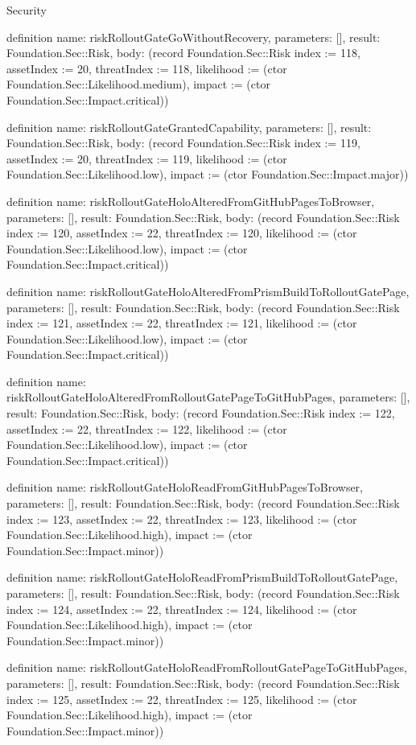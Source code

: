 \begin{lexlean}{Security}
\begin{semanticmodule}
definition{
  name: riskRolloutGateGoWithoutRecovery,
  parameters: [],
  result: Foundation.Sec::Risk,
  body: (record Foundation.Sec::Risk {index := 118, assetIndex := 20, threatIndex := 118, likelihood := (ctor Foundation.Sec::Likelihood.medium), impact := (ctor Foundation.Sec::Impact.critical)})
}

definition{
  name: riskRolloutGateGrantedCapability,
  parameters: [],
  result: Foundation.Sec::Risk,
  body: (record Foundation.Sec::Risk {index := 119, assetIndex := 20, threatIndex := 119, likelihood := (ctor Foundation.Sec::Likelihood.low), impact := (ctor Foundation.Sec::Impact.major)})
}

definition{
  name: riskRolloutGateHoloAlteredFromGitHubPagesToBrowser,
  parameters: [],
  result: Foundation.Sec::Risk,
  body: (record Foundation.Sec::Risk {index := 120, assetIndex := 22, threatIndex := 120, likelihood := (ctor Foundation.Sec::Likelihood.low), impact := (ctor Foundation.Sec::Impact.critical)})
}

definition{
  name: riskRolloutGateHoloAlteredFromPrismBuildToRolloutGatePage,
  parameters: [],
  result: Foundation.Sec::Risk,
  body: (record Foundation.Sec::Risk {index := 121, assetIndex := 22, threatIndex := 121, likelihood := (ctor Foundation.Sec::Likelihood.low), impact := (ctor Foundation.Sec::Impact.critical)})
}

definition{
  name: riskRolloutGateHoloAlteredFromRolloutGatePageToGitHubPages,
  parameters: [],
  result: Foundation.Sec::Risk,
  body: (record Foundation.Sec::Risk {index := 122, assetIndex := 22, threatIndex := 122, likelihood := (ctor Foundation.Sec::Likelihood.low), impact := (ctor Foundation.Sec::Impact.critical)})
}

definition{
  name: riskRolloutGateHoloReadFromGitHubPagesToBrowser,
  parameters: [],
  result: Foundation.Sec::Risk,
  body: (record Foundation.Sec::Risk {index := 123, assetIndex := 22, threatIndex := 123, likelihood := (ctor Foundation.Sec::Likelihood.high), impact := (ctor Foundation.Sec::Impact.minor)})
}

definition{
  name: riskRolloutGateHoloReadFromPrismBuildToRolloutGatePage,
  parameters: [],
  result: Foundation.Sec::Risk,
  body: (record Foundation.Sec::Risk {index := 124, assetIndex := 22, threatIndex := 124, likelihood := (ctor Foundation.Sec::Likelihood.high), impact := (ctor Foundation.Sec::Impact.minor)})
}

definition{
  name: riskRolloutGateHoloReadFromRolloutGatePageToGitHubPages,
  parameters: [],
  result: Foundation.Sec::Risk,
  body: (record Foundation.Sec::Risk {index := 125, assetIndex := 22, threatIndex := 125, likelihood := (ctor Foundation.Sec::Likelihood.high), impact := (ctor Foundation.Sec::Impact.minor)})
}


\end{semanticmodule}
\end{lexlean}
